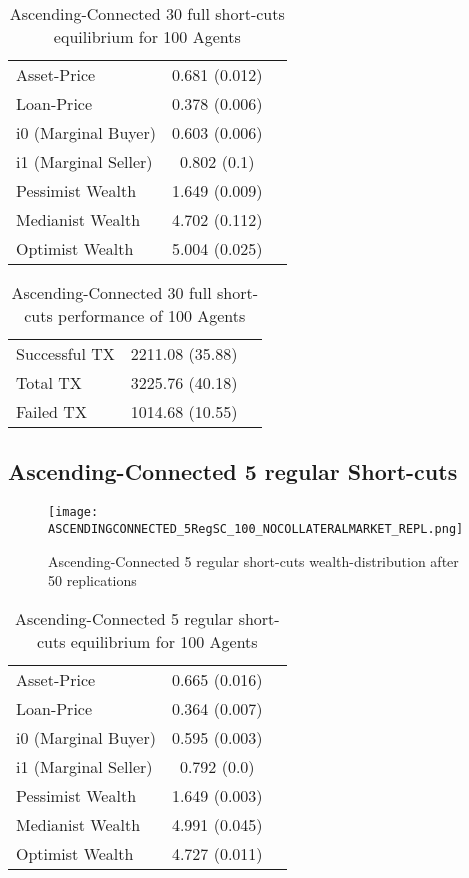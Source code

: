 \documentclass[Bachelorarbeit.tex]{subfiles}
\begin{document}
\begin{table}[!htbp]
	\caption{Ascending-Connected 30 full short-cuts equilibrium for 100 Agents}
	\centering
	\begin{tabular} { l c r }
		\hline
		Asset-Price & 0.681 (0.012) \\
		Loan-Price & 0.378 (0.006) \\
		i0 (Marginal Buyer) & 0.603 (0.006) \\
		i1 (Marginal Seller) & 0.802 (0.1) \\
		Pessimist Wealth & 1.649 (0.009) \\
		Medianist Wealth & 4.702 (0.112) \\
		Optimist Wealth & 5.004 (0.025) \\
		\hline
	\end{tabular}
\end{table} 

\begin{table}[!htbp]
	\caption{Ascending-Connected 30 full short-cuts performance of 100 Agents}
	\centering
	\begin{tabular} { l c r }
		\hline
		Successful TX & 2211.08 (35.88) \\
		Total TX & 3225.76 (40.18) \\
		Failed TX & 1014.68 (10.55) \\
		\hline
	\end{tabular}
\end{table}


\subsection{Ascending-Connected 5 regular Short-cuts }
\begin{figure}[!htbp]
	\centering
  \texttt{[image: ASCENDINGCONNECTED\_5RegSC\_100\_NOCOLLATERALMARKET\_REPL.png]}
	\caption{Ascending-Connected 5 regular short-cuts wealth-distribution after 50 replications}
	\label{fig1}
\end{figure}

\begin{table}[!htbp]
	\caption{Ascending-Connected 5 regular short-cuts equilibrium for 100 Agents}
	\centering
	\begin{tabular} { l c r }
		\hline
		Asset-Price & 0.665 (0.016) \\
		Loan-Price & 0.364 (0.007) \\
		i0 (Marginal Buyer) & 0.595 (0.003) \\
		i1 (Marginal Seller) & 0.792 (0.0) \\
		Pessimist Wealth & 1.649 (0.003) \\
		Medianist Wealth & 4.991 (0.045) \\
		Optimist Wealth & 4.727 (0.011) \\
		\hline
	\end{tabular}
\end{table} 
\end{document}
